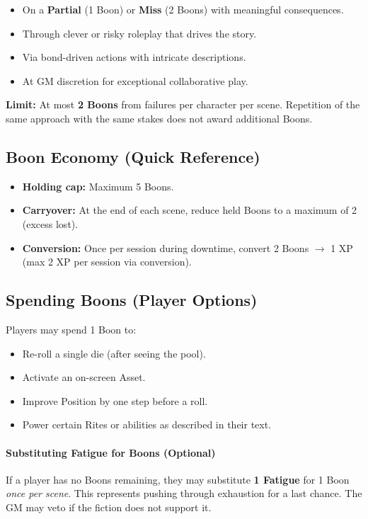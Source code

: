 \begin{itemize}
  \item On a \textbf{Partial} (1 Boon) or \textbf{Miss} (2 Boons) with meaningful consequences.
  \item Through clever or risky roleplay that drives the story.
  \item Via bond-driven actions with intricate descriptions.
  \item At GM discretion for exceptional collaborative play.
\end{itemize}
\textbf{Limit:} At most \textbf{2 Boons} from failures per character per scene. Repetition of the same approach with the same stakes does not award additional Boons.

\subsection{Boon Economy (Quick Reference)}
\label{subsec:boons-economy}

\begin{itemize}
  \item \textbf{Holding cap:} Maximum 5 Boons.
  \item \textbf{Carryover:} At the end of each scene, reduce held Boons to a maximum of 2 (excess lost).
  \item \textbf{Conversion:} Once per session during downtime, convert 2 Boons $\rightarrow$ 1 XP (max 2 XP per session via conversion).
\end{itemize}

\subsection{Spending Boons (Player Options)}
\label{subsec:boons-spend}

Players may spend 1 Boon to:
\begin{itemize}
  \item Re-roll a single die (after seeing the pool).
  \item Activate an on-screen Asset.
  \item Improve Position by one step before a roll.
  \item Power certain Rites or abilities as described in their text.
\end{itemize}

\paragraph{Substituting Fatigue for Boons (Optional)}
If a player has no Boons remaining, they may substitute \textbf{1 Fatigue} for 1 Boon \textit{once per scene}. This represents pushing through exhaustion for a last chance. The GM may veto if the fiction does not support it.

